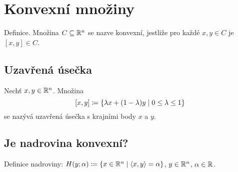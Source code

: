 

\section{Konvexní množiny} \label{sec:konvex}
Definice. Množina $C \subseteq \mathbb{R}^n$ se nazve konvexní, jestliže pro každé $x, y \in C$ je $[x,y] \in C$.

\subsection{Uzavřená úsečka}
Nechť $x, y \in \mathbb{R}^n$. Množina
\[ [x,y] \coloneq \left\lbrace \lambda x + (1-\lambda)y \mid 0 \leq \lambda \leq 1 \right\rbrace \]
se nazývá uzavřená úsečka s krajními body $x$ a $y$.

\subsection{Je nadrovina konvexní?}
Definice nadroviny: $H(y; \alpha) \coloneq \left\lbrace x \in \mathbb{R}^n \mid \langle x, y \rangle = \alpha \right\rbrace$, $y \in \mathbb{R}^n$, $\alpha \in \mathbb{R}$.

